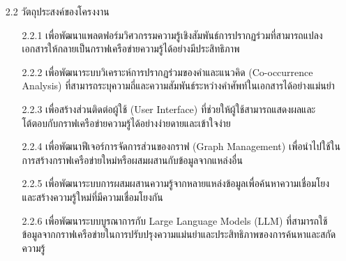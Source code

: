 \documentclass[12pt,a4paper]{article}
\newcommand{\textlight}[1]{{\thailightfont #1}}
\begin{document}
\begin{enumerate}[leftmargin=2cm]
    \item[2.2] วัตถุประสงค์ของโครงงาน
    \vspace{0.05cm}
    \textlight{
        \begin{enumerate}
            \item[2.2.1] เพื่อพัฒนาแพลตฟอร์มวิศวกรรมความรู้เชิงสัมพันธ์การปรากฏร่วมที่สามารถแปลงเอกสารให้กลายเป็นกราฟเครือข่ายความรู้ได้อย่างมีประสิทธิภาพ
            \item[2.2.2] เพื่อพัฒนาระบบวิเคราะห์การปรากฏร่วมของคำและแนวคิด (Co-occurrence Analysis) ที่สามารถระบุความถี่และความสัมพันธ์ระหว่างคำศัพท์ในเอกสารได้อย่างแม่นยำ
            \item[2.2.3] เพื่อสร้างส่วนติดต่อผู้ใช้ (User Interface) ที่ช่วยให้ผู้ใช้สามารถแสดงผลและโต้ตอบกับกราฟเครือข่ายความรู้ได้อย่างง่ายดายและเข้าใจง่าย
            \item[2.2.4] เพื่อพัฒนาฟีเจอร์การจัดการส่วนของกราฟ (Graph Management) เพื่อนำไปใช้ในการสร้างกราฟเครือข่ายใหม่หรือผสมผสานกับข้อมูลจากแหล่งอื่น
            \item[2.2.5] เพื่อพัฒนาระบบการผสมผสานความรู้จากหลายแหล่งข้อมูลเพื่อค้นหาความเชื่อมโยงและสร้างความรู้ใหม่ที่มีความเชื่อมโยงกัน
            \item[2.2.6] เพื่อพัฒนาระบบบูรณาการกับ Large Language Models (LLM) ที่สามารถใช้ข้อมูลจากกราฟเครือข่ายในการปรับปรุงความแม่นยำและประสิทธิภาพของการค้นหาและสกัดความรู้
        \end{enumerate}
    }
    

\end{enumerate}
\end{document}
